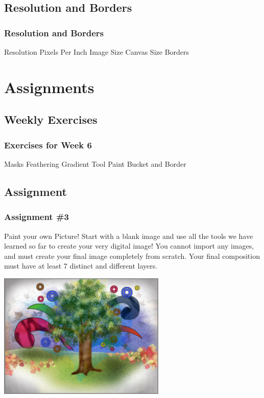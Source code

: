 \documentclass{beamer}
\begin{document}
		\subsection{Resolution and Borders}		
			\begin{frame}
				\frametitle{Resolution and Borders}
				\begin{outline}
					\1 Resolution
					\1 Pixels Per Inch
					\1 Image Size
					\1 Canvas Size
					\1 Borders
				\end{outline}
			\end{frame}
			
		\section{Assignments}
			\subsection{Weekly Exercises}		
			\begin{frame}
				\frametitle{Exercises for Week 6}
				\begin{outline}
					\1 Masks
					\1 Feathering
					\1 Gradient Tool
					\1 Paint Bucket and Border
				\end{outline}
			\end{frame}
		
		\subsection{Assignment}		
			\begin{frame}
				\frametitle{Assignment \#3}
				\begin{outline}
					\1 Paint your own Picture!
					\1 Start with a blank image and use all the tools we have learned so far to create your very digital image!
					\1 You cannot import any images, and must create your final image completely from scratch.
					\1 Your final composition must have at least 7 distinct and different layers.  
				\end{outline}
			\begin{center}
			\includegraphics[width=0.6\textwidth]{images/paint picture assignment.png}
			\end{center}
			\end{frame}
	
\end{document}
